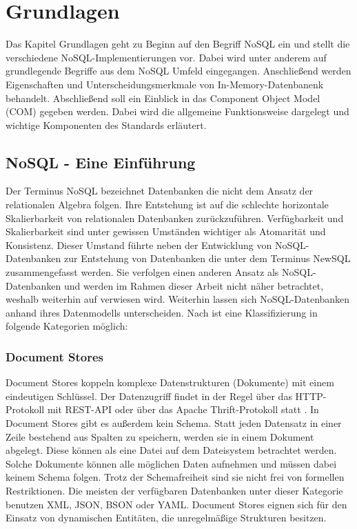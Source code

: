 
\chapter{Grundlagen}
\label{ch:grundlagen}

Das Kapitel Grundlagen geht zu Beginn auf den Begriff NoSQL ein und stellt die verschiedene NoSQL-Implementierungen vor. Dabei wird unter anderem auf grundlegende Begriffe aus dem NoSQL Umfeld eingegangen. Anschließend werden Eigenschaften und Unterscheidungsmerkmale von In-Memory-Datenbanenk behandelt. Abschließend soll ein Einblick in das Component Object Model (COM) gegeben werden. Dabei wird die allgemeine Funktionsweise dargelegt und wichtige Komponenten des Standards erläutert.

\section{NoSQL - Eine Einführung}
\label{ch:grundlagen:sec:NoSQL}

Der Terminus NoSQL bezeichnet Datenbanken die nicht dem Ansatz der relationalen Algebra folgen. Ihre Entstehung ist auf die schlechte horizontale Skalierbarkeit von relationalen Datenbanken zurückzuführen. Verfügbarkeit und Skalierbarkeit sind unter gewissen Umständen wichtiger als Atomarität und Konsistenz. Dieser Umstand führte neben der Entwicklung von NoSQL-Datenbanken zur Entstehung von Datenbanken die unter dem Terminus NewSQL zusammengefasst werden. Sie verfolgen einen anderen Ansatz als NoSQL-Datenbanken und werden im Rahmen dieser Arbeit nicht näher betrachtet, weshalb weiterhin auf \cite{NewSQL2011} verwiesen wird. Weiterhin lassen sich NoSQL-Datenbanken anhand ihres Datenmodells unterscheiden. Nach \cite{vaish2013getting} ist eine Klassifizierung in folgende Kategorien möglich:

\subsection{Document Stores}
\label{ch:grundlagen:sec:NoSQL:DocumentStores}

Document Stores koppeln komplexe Datenstrukturen (Dokumente) mit einem eindeutigen Schlüssel. Der Datenzugriff findet in der Regel über das HTTP-Protokoll mit REST-API oder über das Apache Thrift-Protokoll statt \cite{agarwal2007thrift}. In Document Stores gibt es außerdem kein Schema. Statt jeden Datensatz in einer Zeile bestehend aus Spalten zu speichern, werden sie in einem Dokument abgelegt. Diese können als eine Datei auf dem Dateisystem betrachtet werden. Solche Dokumente können alle möglichen Daten aufnehmen und müssen dabei keinem Schema folgen. Trotz der Schemafreiheit sind sie nicht frei von formellen Restriktionen. Die meisten der verfügbaren Datenbanken unter dieser Kategorie benutzen XML, JSON, BSON oder YAML. Document Stores eignen sich für den Einsatz von dynamischen Entitäten, die unregelmäßige Strukturen besitzen.

